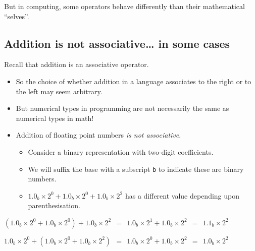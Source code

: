\documentclass[11pt]{article}
\theoremstyle{definition}
\begin{document}
But in computing, some operators behave differently than
their mathematical “selves”.

\subsection{Addition is not associative… in some cases}
\label{sec:orgf9a2272}

Recall that addition is an associative operator.
\begin{itemize}
\item So the choice of whether addition in a language associates to
the right or to the left may seem arbitrary.
\item But numerical types in programming are not necessarily
the same as numerical types in math!
\item Addition of floating point numbers \emph{is not associative}.
\begin{itemize}
\item Consider a binary representation with two-digit coefficients.
\item We will suffix the base with a subscript \texttt{b} to indicate
these are binary numbers.
\item \(1.0_{b} × 2^{0} + 1.0_{b} × 2^{0} + 1.0_{b} × 2^{2}\) has a different value depending
upon parenthesisation.
\end{itemize}
\end{itemize}

\begin{center}
\((1.0_{b} × 2^{0} + 1.0_{b} × 2^{0}) + 1.0_{b} × 2^{2}\ \ =\ \ 1.0_{b} × 2^{1} + 1.0_{b} × 2^{2}\ \ =\ \ 1.1_{b} × 2^{2}\)
\end{center}

\begin{center}
\(1.0_{b} × 2^{0} + (1.0_{b} × 2^{0} + 1.0_{b} × 2^{2})\ \ =\ \ 1.0_{b} × 2^{0} + 1.0_{b} × 2^{2}\ \ =\ \ 1.0_{b} × 2^{2}\)
\end{center}
\end{document}
